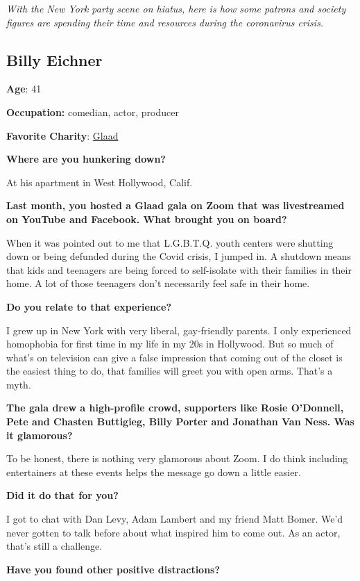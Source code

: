 \emph{With the New York party scene on hiatus, here is how some patrons
and society figures are spending their time and resources during the
coronavirus crisis.}

\hypertarget{billy-eichner}{%
\subsection{Billy Eichner}\label{billy-eichner}}

\textbf{Age}: 41

\textbf{Occupation:} comedian, actor, producer

\textbf{Favorite Charity}: \href{https://www.glaad.org}{Glaad}

\textbf{Where are you hunkering down?}

At his apartment in West Hollywood, Calif.

\textbf{Last month, you hosted a Glaad gala on Zoom that was
livestreamed on YouTube and Facebook. What brought you on board?}

When it was pointed out to me that L.G.B.T.Q. youth centers were
shutting down or being defunded during the Covid crisis, I jumped in. A
shutdown means that kids and teenagers are being forced to self-isolate
with their families in their home. A lot of those teenagers don't
necessarily feel safe in their home.

\textbf{Do you relate to that experience?}

I grew up in New York with very liberal, gay-friendly parents. I only
experienced homophobia for first time in my life in my 20s in Hollywood.
But so much of what's on television can give a false impression that
coming out of the closet is the easiest thing to do, that families will
greet you with open arms. That's a myth.

\textbf{The gala drew a high-profile crowd, supporters like Rosie
O'Donnell, Pete and Chasten Buttigieg, Billy Porter and Jonathan Van
Ness. Was it glamorous?}

To be honest, there is nothing very glamorous about Zoom. I do think
including entertainers at these events helps the message go down a
little easier.

\textbf{Did it do that for you?}

I got to chat with Dan Levy, Adam Lambert and my friend Matt Bomer. We'd
never gotten to talk before about what inspired him to come out. As an
actor, that's still a challenge.

\textbf{Have you found other positive distractions?}


